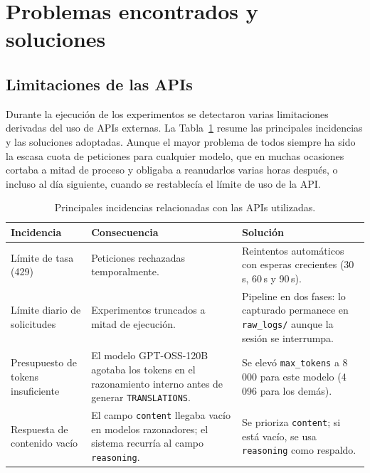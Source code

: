 \section{Problemas encontrados y soluciones}
\label{sec:problemas-soluciones}

\subsection{Limitaciones de las APIs}
\label{subsec:problemas-apis}

Durante la ejecución de los experimentos se detectaron varias limitaciones derivadas del uso de APIs externas. La Tabla~\ref{tab:problemas-apis} resume las principales incidencias y las soluciones adoptadas. Aunque el mayor problema de todos siempre ha sido la escasa cuota de peticiones para cualquier modelo, que en muchas ocasiones cortaba a mitad de proceso  y obligaba a reanudarlos varias horas después, o incluso al día siguiente, cuando se restablecía el límite de uso de la API.

\begin{table}[ht]
	\centering
	\caption{Principales incidencias relacionadas con las APIs utilizadas.}
	\label{tab:problemas-apis}
	\begin{tabularx}{\textwidth}{p{3cm} X X}
		\toprule
		\textbf{Incidencia} & \textbf{Consecuencia} & \textbf{Solución} \\
		\midrule
		
		Límite de tasa (429)
		& Peticiones rechazadas temporalmente.
		& Reintentos automáticos con esperas crecientes (30\,s, 60\,s y 90\,s). \\
		\midrule
		
		Límite diario de solicitudes
		& Experimentos truncados a mitad de ejecución.
		& Pipeline en dos fases: lo capturado permanece en \texttt{raw\_logs/} aunque la sesión se interrumpa. \\
		\midrule
		
		Presupuesto de tokens insuficiente
		& El modelo GPT-OSS-120B agotaba los tokens en el razonamiento interno antes de generar \texttt{TRANSLATIONS}.
		& Se elevó \texttt{max\_tokens} a 8\,000 para este modelo (4\,096 para los demás). \\
		\midrule
		
		Respuesta de contenido vacío
		& El campo \texttt{content} llegaba vacío en modelos razonadores; el sistema recurría al campo \texttt{reasoning}.
		& Se prioriza \texttt{content}; si está vacío, se usa \texttt{reasoning} como respaldo. \\
		
		\bottomrule
	\end{tabularx}
\end{table}

